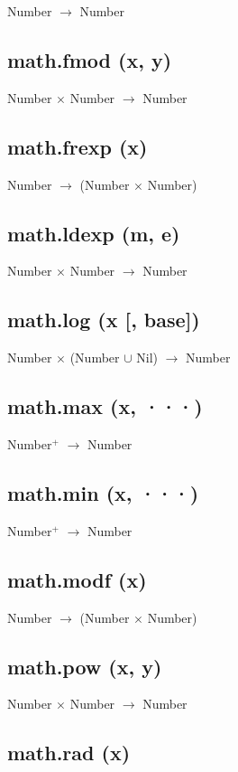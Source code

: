\documentclass[12pt]{article}
\begin{document}
Number $\rightarrow$ Number

\subsection{math.fmod (x, y)}

Number $\times$ Number $\rightarrow$ Number

\subsection{math.frexp (x)}

Number $\rightarrow$ (Number $\times$ Number)

\subsection{math.ldexp (m, e)}

Number $\times$ Number $\rightarrow$ Number

\subsection{math.log (x [, base])}

Number $\times$
(Number $\cup$ Nil) $\rightarrow$
Number

\subsection{math.max (x, ···)}

Number$^+$ $\rightarrow$ Number

\subsection{math.min (x, ···)}

Number$^+$ $\rightarrow$ Number

\subsection{math.modf (x)}

Number $\rightarrow$ (Number $\times$ Number)

\subsection{math.pow (x, y)}

Number $\times$ Number $\rightarrow$ Number

\subsection{math.rad (x)}
\end{document}
